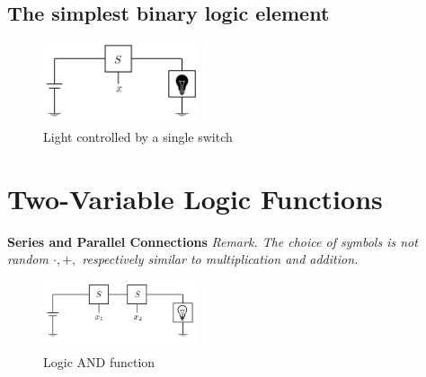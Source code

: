 \documentclass[12pt,openany]{book}
\begin{document}
			      	
			      	\subsection{The simplest binary logic element}
			      	
			      	
			      	\begin{figure}[htp] %
			      		\centering
			      		\includegraphics[width=0.41\textwidth]{circuits/6.1.2.png} %
			      		\caption*{Light controlled by a single switch}
			      	\end{figure}
			      	
			      	
			      	\newpage
			      	\section*{Two-Variable Logic Functions}
			      	\textbf{Series and Parallel Connections}
			      	\newline
			      	\vspace{10px}
			      	\textit{Remark. The choice of symbols is not random $\cdot, +,$ respectively similar to multiplication and addition.}
			      	\vspace{20px}
			      	\begin{figure}[htp] %
			      		\centering
			      		\includegraphics[width=0.41\textwidth]{circuits/6.1.3.png} %
			      		\caption*{Logic AND function}
			      	\end{figure}
			      	
\end{document}
